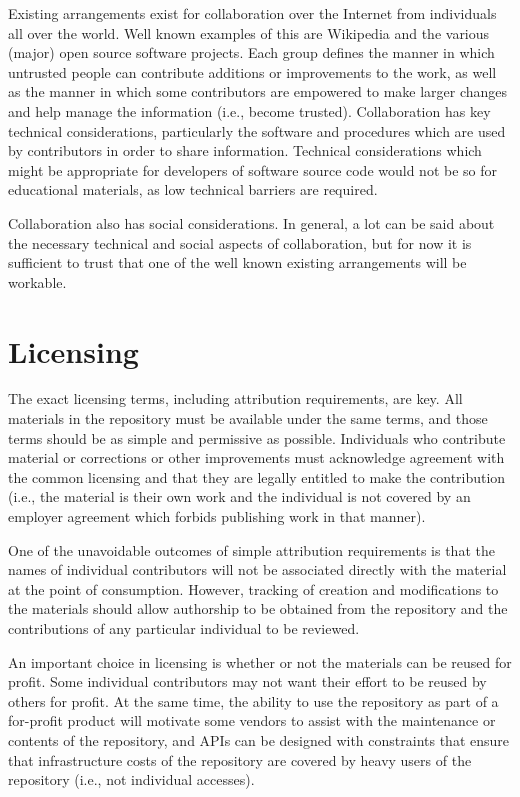 Existing arrangements exist for collaboration over the Internet from individuals
all over the world.  Well known examples of this are Wikipedia and the
various (major) open source software projects.  Each group defines the 
manner in which untrusted people can contribute additions or improvements to
the work, as well as the manner in which some contributors are empowered to
make larger changes and help manage the information (i.e., become trusted).
Collaboration has
key technical considerations, particularly the software and procedures which
are used by contributors in order to share information.  Technical considerations
which might be appropriate for developers of software source code would not
be so for educational materials, as low technical barriers are required.

Collaboration also has social considerations.  In general, a lot can be said
about the necessary technical and social aspects of collaboration, but for
now it is sufficient to trust that one of the well known existing arrangements will
be workable.

\section*{Licensing}

The exact licensing terms, including attribution requirements, are key.  All materials in the
repository must be available under the same terms, and those terms should be as simple
and permissive as possible.  Individuals who contribute material or corrections or other 
improvements must acknowledge agreement with the common licensing and that
they are legally entitled to make the contribution (i.e., the material is
their own work and the individual is not covered by an employer agreement
which forbids publishing work in that manner).

One of the unavoidable outcomes of simple attribution requirements is that
the names of individual contributors
will not be associated directly with the material at the point of consumption.
However, tracking of creation and modifications to the materials should allow 
authorship to be obtained from the repository and the contributions of any
particular individual to be reviewed.

An important choice in licensing is whether or not the materials can be reused
for profit.  Some individual contributors may not want their effort to be 
reused by others for profit.  At the same time, the ability to use the 
repository as part of a for-profit product will motivate some vendors to assist with
the maintenance or contents of the repository, and APIs can be designed with
constraints that ensure that infrastructure costs of the repository are covered by heavy
users of the repository (i.e., not individual accesses).

